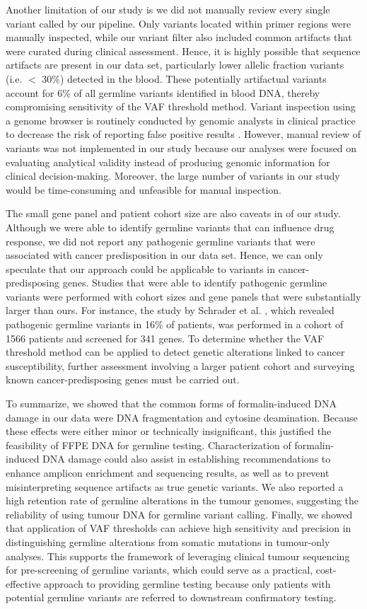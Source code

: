 \documentclass{bmcart}
\begin{document}
Another limitation of our study is we did not manually review every single variant called by our pipeline. Only variants located within primer regions were manually inspected, while our variant filter also included common artifacts that were curated during clinical assessment. Hence, it is highly possible that sequence artifacts are present in our data set, particularly lower allelic fraction variants (i.e. $<$ 30\%) detected in the blood. These potentially artifactual variants account for 6\% of all germline variants identified in blood DNA, thereby compromising sensitivity of the VAF threshold method. Variant inspection using a genome browser is routinely conducted by genomic analysts in clinical practice to decrease the risk of reporting false positive results \cite{Strom2016, Garofalo2016}. However, manual review of variants was not implemented in our study because our analyses were focused on evaluating analytical validity instead of producing genomic information for clinical decision-making. Moreover, the large number of variants in our study would be time-consuming and unfeasible for manual inspection.

The small gene panel and patient cohort size are also caveats in of our study. Although we were able to identify germline variants that can influence drug response, we did not report any pathogenic germline variants that were associated with cancer predisposition in our data set. Hence, we can only speculate that our approach could be applicable to variants in cancer-predisposing genes. Studies that were able to identify pathogenic germline variants were performed with cohort sizes and gene panels that were substantially larger than ours. For instance, the study by Schrader et al. \cite{Schrader2015}, which revealed pathogenic germline variants in 16\% of patients, was performed in a cohort of 1566 patients and screened for 341 genes. To determine whether the VAF threshold method can be applied to detect genetic alterations linked to cancer susceptibility, further assessment involving a larger patient cohort and surveying known cancer-predisposing genes must be carried out.

To summarize, we showed that the common forms of formalin-induced DNA damage in our data were DNA fragmentation and cytosine deamination. Because these effects were either minor or technically insignificant, this justified the feasibility of FFPE DNA for germline testing. Characterization of formalin-induced DNA damage could also assist in establishing recommendations to enhance amplicon enrichment and sequencing results, as well as to prevent misinterpreting sequence artifacts as true genetic variants. We also reported a high retention rate of germline alterations in the tumour genomes, suggesting the reliability of using tumour DNA for germline variant calling. Finally, we showed that application of VAF thresholds can achieve high sensitivity and precision in distinguishing germline alterations from somatic mutations in tumour-only analyses. This supports the framework of leveraging clinical tumour sequencing for pre-screening of germline variants, which could serve as a practical, cost-effective approach to providing germline testing because only patients with potential germline variants are referred to downstream confirmatory testing.
\end{document}
